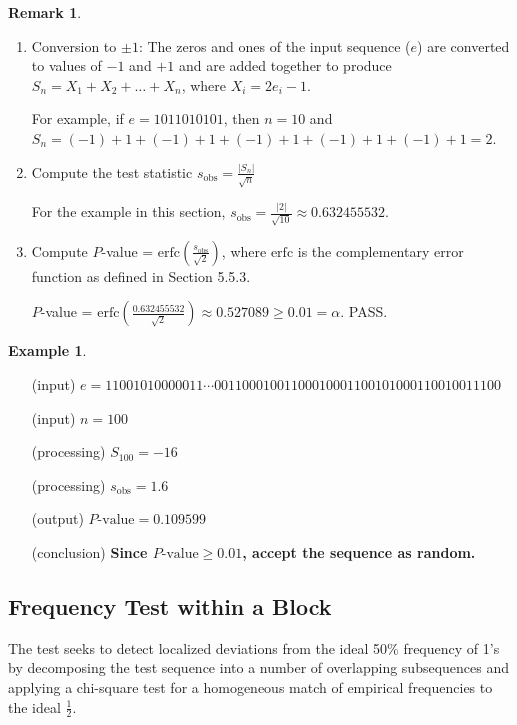 \documentclass[12pt,openany]{book}
\theoremstyle{definition}
\newtheorem{remark}{Remark}[chapter]
\newtheorem{example}{Example}[chapter]
\begin{document}
	\begin{remark}
		\begin{enumerate}
			\item Conversion to \(\pm 1\): The zeros and ones of the input sequence (\(e\)) are converted to values of \(-1\) and \(+1\) and are added together to produce \(S_n = X_1 + X_2 + \ldots + X_n\), where \(X_i = 2e_i - 1\).
			
			For example, if \(e = 1011010101\), then \(n=10\) and \(S_n = (-1) + 1 + (-1) + 1 + (-1) + 1 + (-1) + 1 + (-1) + 1 = 2\).
			
			\item Compute the test statistic \(s_{\text{obs}} = \frac{|S_n|}{\sqrt{n}}\)
			
			For the example in this section, \(s_{\text{obs}} = \frac{|2|}{\sqrt{10}} \approx 0.632455532\).
			
			\item Compute \(P\)-value = \(\text{erfc}\left(\frac{s_{\text{obs}}}{\sqrt{2}}\right)\), where \(\text{erfc}\) is the complementary error function as defined in Section 5.5.3.
			
		\(P\)-value = \(\text{erfc}\left(\frac{0.632455532}{\sqrt{2}}\right) \approx 0.527089\geq 0.01=\alpha\). PASS.
		\end{enumerate}
	\end{remark}
	
	\begin{example}
		\ \begin{itemize}
			\item[(input)] \( e = 11001010000011\cdots 00110001001100010001100101000110010011100 \)
			\item[(input)] \( n = 100 \)
			\item[(processing)] \( S_{100} = -16 \)
			\item[(processing)] \( s_{\text{obs}} = 1.6 \)
			\item[(output)] \( P\text{-value} = 0.109599 \)
			\item[(conclusion)] \textbf{Since \( P\text{-value} \geq 0.01 \), accept the sequence as random.}
		\end{itemize}
	\end{example}

	\subsection{Frequency Test within a Block}
	
	The test seeks to detect localized deviations from the ideal 50\% frequency of 1's by decomposing the test sequence into a number of overlapping subsequences and applying a chi-square test for a homogeneous match of empirical frequencies to the ideal \( \frac{1}{2} \).
	
\end{document}
